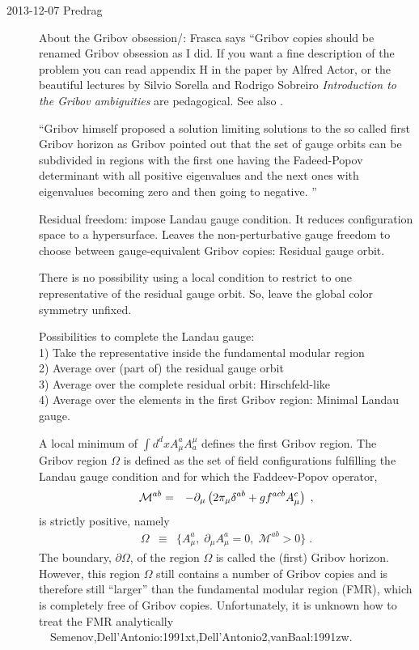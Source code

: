 \begin{description}
\item[2013-12-07  Predrag]
About the
{Gribov obsession/}: Frasca says ``Gribov copies should be renamed Gribov
obsession as I did. If you want a fine description of the problem you can
read appendix H in the paper by Alfred Actor, or the
beautiful lectures by Silvio Sorella and Rodrigo Sobreiro
{\em Introduction to the {Gribov} ambiguities} are pedagogical.
See also
.

``Gribov himself proposed a solution limiting solutions to the so called
first Gribov horizon as Gribov pointed out that the set of gauge orbits
can be subdivided in regions with the first one having the Fadeed-Popov
determinant with all positive eigenvalues and the next ones with
eigenvalues becoming zero and then going to negative. ''

Residual freedom: impose Landau gauge condition. It reduces configuration
space to a hypersurface. Leaves the non-perturbative gauge freedom to
choose between gauge-equivalent Gribov copies: Residual gauge orbit.

There is no possibility using a local condition to restrict to one
representative of the residual gauge orbit. So, leave the global color
symmetry unfixed.

Possibilities to complete the Landau gauge:
\\
1) Take the representative inside the fundamental
modular region
\\
2) Average over (part of) the residual gauge orbit
\\
3) Average over the complete residual orbit: Hirschfeld-like
\\
4)
Average over the elements in the first Gribov region:
Minimal Landau gauge.

A local minimum of $\int d^dx A_\mu^a A^\mu_a$
defines the first Gribov region.
The Gribov region $\Omega$ is  defined as the set of
field configurations fulfilling the Landau gauge condition and for
which the Faddeev-Popov operator,
\begin{eqnarray}
\mathcal{M}^{ab} &=&  -\partial_{\mu}\left( 2\pi_{\mu} \delta^{ab}
    + g f^{acb} A^c_{\mu} \right) \;,
\end{eqnarray}
is strictly positive, namely
\begin{eqnarray}
\Omega &\equiv &\{ A^a_{\mu}, \; \partial_{\mu} A^a_{\mu}=0,
    \; \mathcal{M}^{ab}  >0\} \;.
\end{eqnarray}
The boundary, $\partial \Omega$, of the region $\Omega$ is called the
(first) Gribov horizon. However, this region $\Omega$ still
contains a number of Gribov copies and is therefore still ``larger'' than
the fundamental modular region (FMR), which is completely free of Gribov
copies. Unfortunately, it is unknown how to treat the FMR analytically
~~{Semenov,Dell'Antonio:1991xt,Dell'Antonio2,vanBaal:1991zw}.


\end{description}
